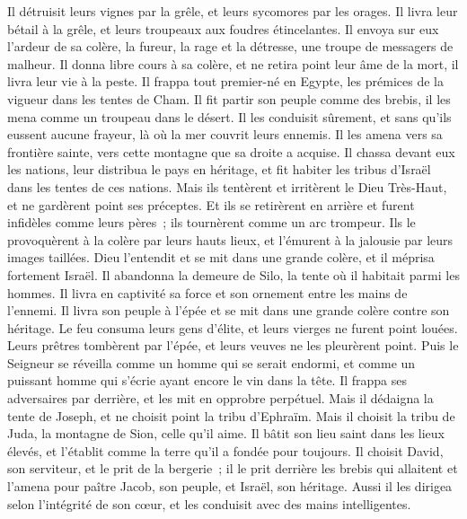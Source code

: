 \begin{multicols}{2}
Il détruisit leurs vignes par la grêle, et leurs sycomores par les orages.
Il livra leur bétail à la grêle, et leurs troupeaux aux foudres étincelantes.
Il envoya sur eux l'ardeur de sa colère, la fureur, la rage et la détresse, une troupe de messagers de malheur.
Il donna libre cours à sa colère, et ne retira point leur âme de la mort, il livra leur vie à la peste.
Il frappa tout premier-né en Egypte, les prémices de la vigueur dans les tentes de Cham.
Il fit partir son peuple comme des brebis, il les mena comme un troupeau dans le désert.
Il les conduisit sûrement, et sans qu'ils eussent aucune frayeur, là où la mer couvrit leurs ennemis.
Il les amena vers sa frontière sainte, vers cette montagne que sa droite a acquise.
Il chassa devant eux les nations, leur distribua le pays en héritage, et fit habiter les tribus d'Israël dans les tentes de ces nations.
Mais ils tentèrent et irritèrent le Dieu Très-Haut, et ne gardèrent point ses préceptes.
Et ils se retirèrent en arrière et furent infidèles comme leurs pères~; ils tournèrent comme un arc trompeur.
Ils le provoquèrent à la colère par leurs hauts lieux, et l'émurent à la jalousie par leurs images taillées.
Dieu l'entendit et se mit dans une grande colère, et il méprisa fortement Israël.
Il abandonna la demeure de Silo, la tente où il habitait parmi les hommes.
Il livra en captivité sa force et son ornement entre les mains de l'ennemi.
Il livra son peuple à l'épée et se mit dans une grande colère contre son héritage.
Le feu consuma leurs gens d'élite, et leurs vierges ne furent point louées.
Leurs prêtres tombèrent par l'épée, et leurs veuves ne les pleurèrent point.
Puis le Seigneur se réveilla comme un homme qui se serait endormi, et comme un puissant homme qui s'écrie ayant encore le vin dans la tête.
Il frappa ses adversaires par derrière, et les mit en opprobre perpétuel.
Mais il dédaigna la tente de Joseph, et ne choisit point la tribu d'Ephraïm.
Mais il choisit la tribu de Juda, la montagne de Sion, celle qu'il aime.
Il bâtit son lieu saint dans les lieux élevés, et l'établit comme la terre qu'il a fondée pour toujours.
Il choisit David, son serviteur, et le prit de la bergerie~;
il le prit derrière les brebis qui allaitent et l'amena pour paître Jacob, son peuple, et Israël, son héritage.
Aussi il les dirigea selon l'intégrité de son cœur, et les conduisit avec des mains intelligentes.

\end{multicols}
